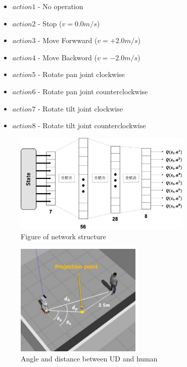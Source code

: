 \documentclass[12pt]{sonota/aislab}
\begin{document}
\begin{itemize}
    \item $action1$ - No operation 
    \item $action2$ - Stop ($v = 0.0 m/s$)
    \item $action3$ - Move Forwward ($v = +2.0 m/s$)
    \item $action4$ - Move Backword ($v = -2.0 m/s$)
    \item $action5$ - Rotate pan joint clockwise
    \item $action6$ - Rotate pan joint counterclockwise
    \item $action7$ - Rotate tilt joint clockwise 
    \item $action8$ - Rotate tilt joint counterclockwise
\end{itemize}

\begin{figure}[t]
\begin{center}
\includegraphics[clip, width=8.5cm]{figs/network_structure.eps}
\caption{Figure of network structure}
\label{structure}
\end{center}
\end{figure}

\begin{figure}[t]
\begin{center}
\includegraphics[clip, width=6cm]{figs/input_term.eps}
\caption{Angle and distance between UD and human}
\label{input_term}
\end{center}
\end{figure}
\end{document}
